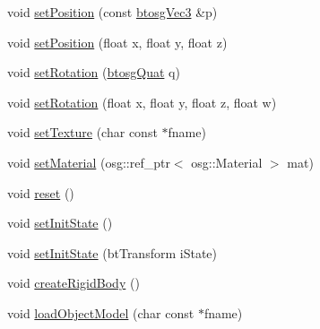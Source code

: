\begin{DoxyCompactItemize}
void \mbox{\hyperlink{classbtosgObject_ace6b51040b7ddce90818174200cc6074}{set\+Position}} (const \mbox{\hyperlink{classbtosgVec3}{btosg\+Vec3}} \&p)
\item 
void \mbox{\hyperlink{classbtosgObject_adb9f2cff0faf66dc252cd7c97b11ac84}{set\+Position}} (float x, float y, float z)
\item 
void \mbox{\hyperlink{classbtosgObject_a6365748d5506bb9da31907c9988071fa}{set\+Rotation}} (\mbox{\hyperlink{classbtosgQuat}{btosg\+Quat}} q)
\item 
void \mbox{\hyperlink{classbtosgObject_a4d21ca59b944fd26644db35d3e9ba67a}{set\+Rotation}} (float x, float y, float z, float w)
\item 
void \mbox{\hyperlink{classbtosgObject_aff54acbc7c66811efb0cf2838107a241}{set\+Texture}} (char const $\ast$fname)
\item 
void \mbox{\hyperlink{classbtosgObject_a6ab7b9e0553dab398b980637788b56a8}{set\+Material}} (osg\+::ref\+\_\+ptr$<$ osg\+::\+Material $>$ mat)
\item 
void \mbox{\hyperlink{classbtosgObject_a93983f9180dd0672f8779cf2baa78580}{reset}} ()
\item 
void \mbox{\hyperlink{classbtosgObject_ad1508a0ce28cfac83e5f0ff6245f91b5}{set\+Init\+State}} ()
\item 
void \mbox{\hyperlink{classbtosgObject_a6ceb08e59ee95acaaef389ee198d2b56}{set\+Init\+State}} (bt\+Transform i\+State)
\item 
void \mbox{\hyperlink{classbtosgObject_a029dbe9134fa94e7355799f67fb2cd6d}{create\+Rigid\+Body}} ()
\item 
void \mbox{\hyperlink{classbtosgObject_a91838b8235579da178fcc06e6d3d47f3}{load\+Object\+Model}} (char const $\ast$fname)
\end{DoxyCompactItemize}
